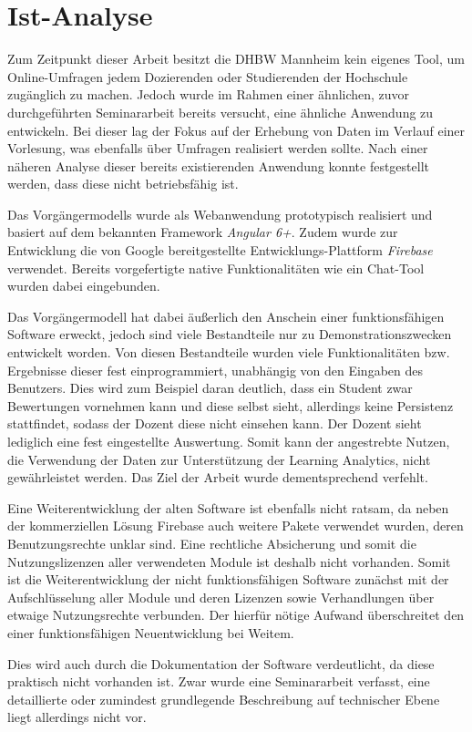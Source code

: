 \section{Ist-Analyse}
\label{sec:IstAnalyse}

Zum Zeitpunkt dieser Arbeit besitzt die \acs{DHBW} Mannheim kein eigenes Tool, um Online-Umfragen jedem Dozierenden oder Studierenden der Hochschule zugänglich zu machen.
Jedoch wurde im Rahmen einer ähnlichen, zuvor durchgeführten Seminararbeit bereits versucht, eine ähnliche Anwendung zu entwickeln.
Bei dieser lag der Fokus auf der Erhebung von Daten im Verlauf einer Vorlesung, was ebenfalls über Umfragen realisiert werden sollte.
Nach einer näheren Analyse dieser bereits existierenden Anwendung konnte festgestellt werden, dass diese nicht betriebsfähig ist.

Das Vorgängermodells wurde als Webanwendung prototypisch realisiert und basiert auf dem bekannten Framework \emph{Angular 6+}.
Zudem wurde zur Entwicklung die von Google bereitgestellte Entwicklungs-Plattform \emph{Firebase} verwendet.
Bereits vorgefertigte native Funktionalitäten wie ein Chat-Tool wurden dabei eingebunden.

Das Vorgängermodell hat dabei äußerlich den Anschein einer funktionsfähigen Software erweckt, jedoch sind viele Bestandteile nur zu Demonstrationszwecken entwickelt worden.
Von diesen Bestandteile wurden viele Funktionalitäten bzw. Ergebnisse dieser fest einprogrammiert, unabhängig von den Eingaben des Benutzers.
Dies wird zum Beispiel daran deutlich, dass ein Student zwar Bewertungen vornehmen kann und diese selbst sieht, allerdings keine Persistenz stattfindet, sodass der Dozent diese nicht einsehen kann.
Der Dozent sieht lediglich eine fest eingestellte Auswertung.
Somit kann der angestrebte Nutzen, die Verwendung der Daten zur Unterstützung der Learning Analytics, nicht gewährleistet werden.
Das Ziel der Arbeit wurde dementsprechend verfehlt.

Eine Weiterentwicklung der alten Software ist ebenfalls nicht ratsam, da neben der kommerziellen Lösung Firebase auch weitere Pakete verwendet wurden, deren Benutzungsrechte unklar sind.
Eine rechtliche Absicherung und somit die Nutzungslizenzen aller verwendeten Module ist deshalb nicht vorhanden.
Somit ist die Weiterentwicklung der nicht funktionsfähigen Software zunächst mit der Aufschlüsselung aller Module und deren Lizenzen sowie Verhandlungen über etwaige Nutzungsrechte verbunden.
Der hierfür nötige Aufwand überschreitet den einer funktionsfähigen Neuentwicklung bei Weitem.

Dies wird auch durch die Dokumentation der Software verdeutlicht, da diese praktisch nicht vorhanden ist.
Zwar wurde eine Seminararbeit verfasst, eine detaillierte oder zumindest grundlegende Beschreibung auf technischer Ebene liegt allerdings nicht vor.

